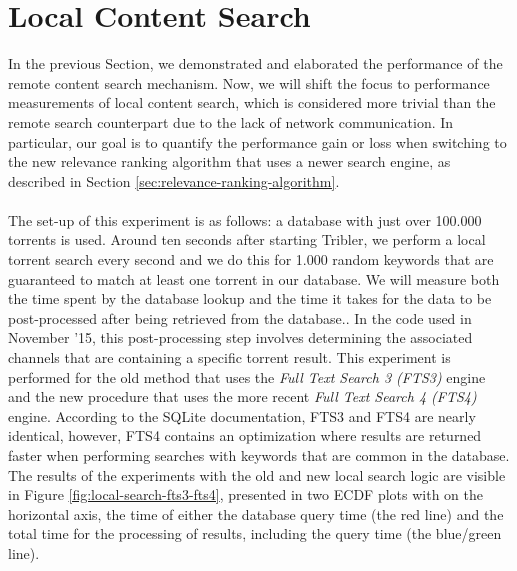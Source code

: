 \section{Local Content Search}
\label{sec:local-content-search}
In the previous Section, we demonstrated and elaborated the performance of the remote content search mechanism. Now, we will shift the focus to performance measurements of local content search, which is considered more trivial than the remote search counterpart due to the lack of network communication. In particular, our goal is to quantify the performance gain or loss when switching to the new relevance ranking algorithm that uses a newer search engine, as described in Section \ref{sec:relevance-ranking-algorithm}.\\\\
The set-up of this experiment is as follows: a database with just over 100.000 torrents is used. Around ten seconds after starting Tribler, we perform a local torrent search every second and we do this for 1.000 random keywords that are guaranteed to match at least one torrent in our database. We will measure both the time spent by the database lookup and the time it takes for the data to be post-processed after being retrieved from the database.. In the code used in November '15, this post-processing step involves determining the associated channels that are containing a specific torrent result. This experiment is performed for the old method that uses the \emph{Full Text Search 3 (FTS3)} engine and the new procedure that uses the more recent \emph{Full Text Search 4 (FTS4)} engine. According to the SQLite documentation, FTS3 and FTS4 are nearly identical, however, FTS4 contains an optimization where results are returned faster when performing searches with keywords that are common in the database. The results of the experiments with the old and new local search logic are visible in Figure \ref{fig:local-search-fts3-fts4}, presented in two ECDF plots with on the horizontal axis, the time of either the database query time (the red line) and the total time for the processing of results, including the query time (the blue/green line).\\

